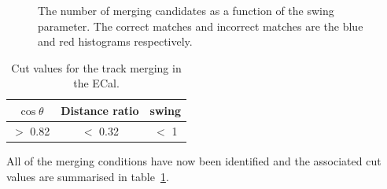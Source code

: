 \begin{figure}
  \centering
  \caption{The number of merging candidates as a function of the swing parameter.  The correct matches and incorrect matches are the blue and red histograms respectively.}
  \label{fig:TrackMergingSwing}
\end{figure}
\begin{table}[b!]
  \begin{tabular}{ c c c }
    $\cos\theta$ & Distance ratio & swing \\ \hline \hline
    $>$ 0.82 & $<$ 0.32 & $<$ 1 \\
  \end{tabular}
  \caption{Cut values for the track merging in the ECal.}
  \label{table:TrackMergingParameters}
\end{table}
\newline
\newline
All of the merging conditions have now been identified and the associated cut values are summarised in table~\ref{table:TrackMergingParameters}.



